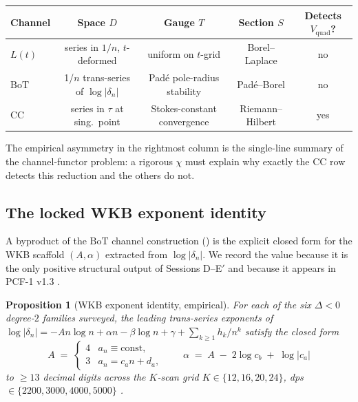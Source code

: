 \documentclass[11pt,reqno]{amsart}
\theoremstyle{plain}
\newtheorem{proposition}[theorem]{Proposition}
\theoremstyle{definition}
\theoremstyle{remark}
\newcommand{\Lt}{L(t)}
\newcommand{\BoT}{\mathrm{BoT}}
\newcommand{\CC}{\mathrm{CC}}
\newcommand{\Vquad}{V_{\mathrm{quad}}}
\newcommand{\dn}{\delta_{n}}
\begin{document}
\begin{center}
\renewcommand{\arraystretch}{1.25}
\begin{tabular}{lcccc}
\hline
Channel & Space $D$ & Gauge $T$ & Section $S$ &
  Detects $\Vquad$? \\
\hline
$\Lt$  & series in $1/n$, $t$-deformed &
  uniform on $t$-grid &
  Borel--Laplace & no \\
$\BoT$ & 1/$n$ trans-series of $\log|\dn|$ &
  Pad\'e pole-radius stability &
  Pad\'e--Borel & no \\
$\CC$  & series in $\tau$ at sing.\ point &
  Stokes-constant convergence &
  Riemann--Hilbert & yes \\
\hline
\end{tabular}
\end{center}

\noindent The empirical asymmetry in the rightmost column is
the single-line summary of the channel-functor problem: a
rigorous $\chi$ must explain why exactly the $\CC$ row
detects this reduction and the others do not.

\subsection{The locked WKB exponent identity}
\label{ssec:wkb}

A byproduct of the $\BoT$ channel construction
() is the explicit closed form for the WKB
scaffold $(A, \alpha)$ extracted from $\log |\dn|$. We
record the value because it is the only positive structural
output of Sessions D--E$'$ and because it appears in PCF-1
v1.3 \cite{siarc_pcf1_v13}.

\begin{proposition}[WKB exponent identity, empirical]
\label{prop:wkb}
For each of the six $\Delta<0$ degree-$2$ families surveyed,
the leading trans-series exponents of
$\log|\dn| = -A n \log n + \alpha n - \beta \log n + \gamma
+ \sum_{k \ge 1} h_k / n^k$
satisfy the closed form
\[
  A \;=\; \begin{cases} 4 & a_n \equiv \text{const}, \\
                        3 & a_n = c_a n + d_a, \end{cases}
  \qquad
  \alpha \;=\; A \;-\; 2 \log c_b \;+\; \log|c_a|
\]
to $\geq 13$ decimal digits across the $K$-scan grid
$K \in \{12, 16, 20, 24\}$, dps $\in \{2200, 3000, 4000,
5000\}$ \cite{siarc_borel_kscan}.
\end{proposition}
\end{document}

